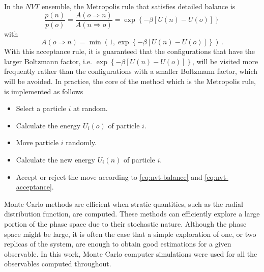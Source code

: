 In the $NVT$ ensemble, the Metropolis rule that satisfies detailed balance is
\begin{equation}
    \frac{p(n)}{p(o)} = \frac{A(o \Longrightarrow n)}{A(n \Longrightarrow o)} =
    \exp{ \left\{ -\beta \left[U(n) - U(o)\right] \right\} }
    \label{eq:nvt-balance}
\end{equation}
with
\begin{equation}
    A(o \Longrightarrow n) = \min{ \left(1, \exp{ \left\{ -\beta \left[U(n) - U(o)\right] \right\} } \right)} 
    \, .
    \label{eq:nvt-acceptance}
\end{equation}
With this acceptance rule, it is guaranteed that the configurations that have the larger
Boltzmann factor, i.e. $\exp{ \left\{ -\beta \left[U(n) - U(o)\right] \right\} }$, 
will be visited more frequently rather than the configurations with a smaller
Boltzmann factor, which will be avoided.
In practice, the core of the method which is the Metropolis rule, is implemented as follows
\newpage
\begin{itemize}
    \item Select a particle $i$ at random.
    \item Calculate the energy $U_{i}(o)$ of particle $i$.
    \item Move particle $i$ randomly.
    \item Calculate the new energy $U_{i}(n)$ of particle $i$.
    \item Accept or reject the move according to \autoref{eq:nvt-balance} and \autoref{eq:nvt-acceptance}.
\end{itemize}
Monte Carlo methods are efficient when stratic quantities, such as the radial distribution
function, are computed. These methods can efficiently explore a large portion of the phase
space due to their stochastic nature. Although the phase space might be large, it is often
the case that a simple exploration of one, or two replicas of the system, are enough
to obtain good estimations for a given observable. In this work, Monte Carlo computer 
simulations were used for all the observables computed throughout.

